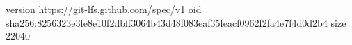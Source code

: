 version https://git-lfs.github.com/spec/v1
oid sha256:8256323e3fe8e10f2dbff3064b43d48f083eaf35feacf0962f2fa4e7f4d0d2b4
size 22040
